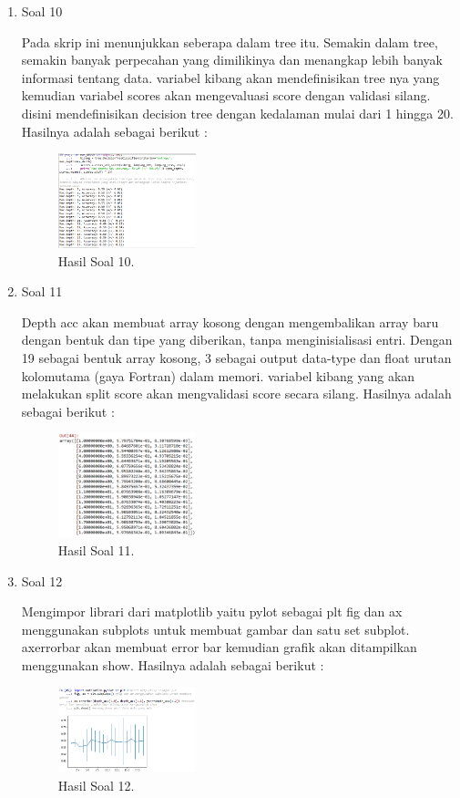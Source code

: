 \begin{enumerate}
	\item Soal 10
	\hfill\break
	
	Pada skrip ini menunjukkan seberapa dalam tree itu. Semakin dalam tree, semakin banyak perpecahan yang dimilikinya dan menangkap lebih banyak informasi tentang data. variabel kibang akan mendefinisikan tree nya yang kemudian variabel scores akan mengevaluasi score dengan validasi silang. disini mendefinisikan decision tree dengan kedalaman mulai dari 1 hingga 20. Hasilnya adalah sebagai berikut :
	\begin{figure}[H]
	\centering
		\includegraphics[width=4cm]{figures/1174017/2/hasilsoal10.PNG}
		\caption{Hasil Soal 10.}
	\end{figure}

	\item Soal 11
	\hfill\break
	
	Depth acc akan membuat array kosong dengan mengembalikan array baru dengan bentuk dan tipe yang diberikan, tanpa menginisialisasi entri. Dengan 19 sebagai bentuk array kosong, 3 sebagai output data-type dan float urutan kolomutama (gaya Fortran) dalam memori. variabel kibang yang akan melakukan split score akan mengvalidasi score secara silang. Hasilnya adalah sebagai berikut :
	\begin{figure}[H]
	\centering
		\includegraphics[width=4cm]{figures/1174017/2/hasilsoal11.PNG}
		\caption{Hasil Soal 11.}
	\end{figure}

	\item Soal 12
	\hfill\break
	
	Mengimpor librari dari matplotlib yaitu pylot sebagai plt fig dan ax menggunakan subplots untuk membuat gambar dan satu set subplot. axerrorbar akan membuat error bar kemudian grafik akan ditampilkan menggunakan show. Hasilnya adalah sebagai berikut :
	\begin{figure}[H]
	\centering
		\includegraphics[width=4cm]{figures/1174017/2/hasilsoal12.PNG}
		\caption{Hasil Soal 12.}
	\end{figure}
\end{enumerate}


